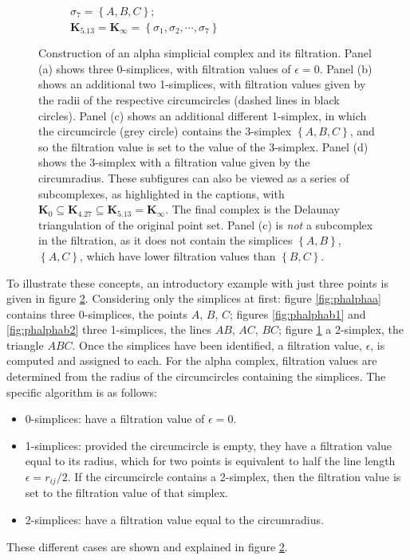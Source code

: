 \begin{figure}[tb]
\begin{subfigure}[b]{0.45\textwidth}
         \caption{$\sigma_7=\left\{A,B,C\right\}$; \\ $\mathbf{K}_{5.13}=\mathbf{K}_{\infty} = \left\{\sigma_1,\sigma_2,\cdots,\sigma_7\right\}$}
         \label{fig:phalphac}
     \end{subfigure}
     \hfill
    
	\caption{Construction of an alpha simplicial complex and its filtration. Panel (a) shows three 0\--simplices, with filtration values of $\epsilon=0$. Panel (b) shows an additional two 1\--simplices, with filtration values given by the radii of the respective circumcircles (dashed lines in black circles). Panel (c) shows an additional different 1\--simplex, in which the circumcircle (grey circle) contains the 3\--simplex $\left\{A,B,C\right\}$, and so the filtration value is set to the value of the 3\--simplex. Panel (d) shows the 3\--simplex with a filtration value given by the circumradius.
	These subfigures can also be viewed as a series of subcomplexes, as highlighted in the captions, with $\mathbf{K}_0\subseteq\mathbf{K}_{4.27}\subseteq\mathbf{K}_{5.13}=\mathbf{K}_\infty$. The final complex is the Delaunay triangulation of the original point set. Panel (c) is \textit{not} a subcomplex in the filtration, as it does not contain the simplices $\left\{A,B\right\}$, $\left\{A,C\right\}$, which have lower filtration values than $\left\{B,C\right\}$. }
	\label{fig:phalpha}
\end{figure}

To illustrate these concepts, an introductory example with just three points is given in figure \ref{fig:phalpha}.
Considering only the simplices at first: figure \ref{fig:phalphaa} contains three 0\--simplices, the points $A$, $B$, $C$; figures \ref{fig:phalphab1} and \ref{fig:phalphab2} three 1\--simplices, the lines $AB$, $AC$, $BC$; figure \ref{fig:phalphac} a 2\--simplex, the triangle $ABC$.
Once the simplices have been identified, a filtration value, $\epsilon$, is computed and assigned to each.
For the alpha complex, filtration values are determined from the radius of the circumcircles containing the simplices.
The specific algorithm is as follows:
\begin{itemize}
	\item 0\--simplices: have a filtration value of $\epsilon=0$.
	\item 1\--simplices: provided the circumcircle is empty, they have a filtration value equal to its radius, which for two points is equivalent to half the line length $\epsilon=r_{ij}/2$.
	If the circumcircle contains a 2\--simplex, then the filtration value is set to the filtration value of that simplex.
	\item 2\--simplices: have a filtration value equal to the circumradius.
\end{itemize}
These different cases are shown and explained in figure \ref{fig:phalpha}.

